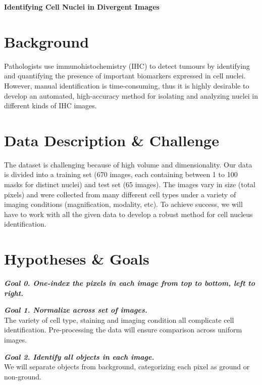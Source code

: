 \documentclass[11pt]{article}
\begin{document}

\begin{center}
{\bf Identifying Cell Nuclei in Divergent Images }
\end{center}

\section{Background}

Pathologists use immunohistochemistry (IHC) to detect tumours by identifying and quantifying the presence of important biomarkers expressed in cell nuclei. However, manual identification is time-consuming, thus it is highly desirable to develop an automated, high-accuracy method for isolating and analyzing nuclei in different kinds of IHC images.

\section{Data Description \& Challenge}

The dataset is challenging because of high volume and dimensionality. Our data is divided into a training set (670 images, each containing between 1 to 100 masks for distinct nuclei) and test set (65 images). The images vary in size (total pixels) and were collected from many different cell types under a variety of imaging conditions (magnification, modality, etc). To achieve success, we will have to work with all the given data to develop a robust method for cell nucleus identification.

\section{Hypotheses \& Goals}

\textbf{\textit{Goal 0. One-index the pixels in each image from top to bottom, left to right.}}

\textbf{\textit{Goal 1. Normalize across set of images.}}\\
The variety of cell type, staining and imaging condition all complicate cell identification. Pre-processing the data will ensure comparison across uniform images.

\textbf{\textit{Goal 2. Identify all objects in each image.}}\\
We will separate objects from background, categorizing each pixel as ground or non-ground.
\end{document}
